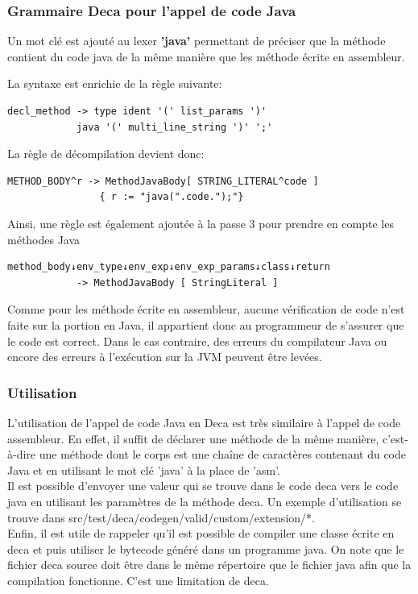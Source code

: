 \documentclass[12pt, a4paper, one side]{article}
\begin{document}
    \subsubsection{Grammaire Deca pour l'appel de code Java}
    Un mot clé est ajouté au lexer \textbf{'java'} permettant de préciser que la méthode contient du code java de la même manière que les méthode écrite en assembleur.

    La syntaxe est enrichie de la règle suivante:
    \begin{lstlisting}
decl_method -> type ident '(' list_params ')'
            java '(' multi_line_string ')' ';'
    \end{lstlisting}
    La règle de décompilation devient donc:
    \begin{lstlisting}
METHOD_BODY^r -> MethodJavaBody[ STRING_LITERAL^code ]
                { r := "java(".code.");"}
    \end{lstlisting}
    Ainsi, une règle est également ajoutée à la passe 3 pour prendre en compte les méthodes Java
    \begin{lstlisting}
method_body↓env_type↓env_exp↓env_exp_params↓class↓return
            -> MethodJavaBody [ StringLiteral ]
    \end{lstlisting}

    Comme pour les méthode écrite en assembleur, aucune vérification de code n'est faite sur la portion en Java, il appartient donc au programmeur de s'assurer que le code est correct. Dans le cas contraire, des erreurs du compilateur Java  ou encore des erreurs à l'exécution sur la JVM peuvent être levées.

    \subsubsection{Utilisation}
    L'utilisation de l'appel de code Java en Deca est très similaire à l'appel de code assembleur. En effet, il suffit de déclarer une méthode de la même manière, c'est-à-dire une méthode dont le corps est une chaîne de caractères contenant du code Java et en utilisant le mot clé 'java' à la place de 'asm'.
    \\

    Il est possible d'envoyer une valeur qui se trouve dans le code deca vers le code java en utilisant les paramètres de la méthode deca. Un exemple d'utilisation se trouve dans src/test/deca/codegen/valid/custom/extension/*.
    \\

    Enfin, il est utile de rappeler qu'il est possible de compiler une classe écrite en deca et puis utiliser le bytecode généré dans un programme java. On note que le fichier deca source doit être dans le même répertoire que le fichier java afin que la compilation fonctionne. C'est une limitation de deca.
\end{document}
